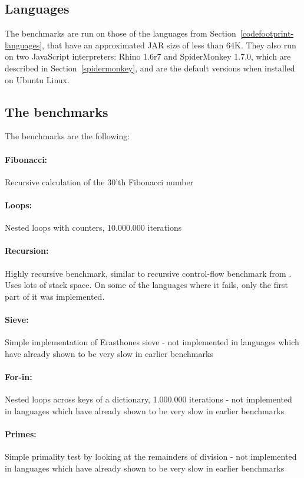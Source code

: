 \documentclass[11pt]{report}
\begin{document}
\subsection{Languages}
The benchmarks are run on those of the languages from Section~\ref{codefootprint-languages}, that have an approximated JAR size of less than 64K. They also run on two JavaScript interpreters: Rhino 1.6r7 and SpiderMonkey 1.7.0, which are described in Section~\ref{spidermonkey}, and are the default versions when installed on Ubuntu Linux.

\subsection{The benchmarks}
The benchmarks are the following:

\paragraph{Fibonacci:} Recursive calculation of the 30'th Fibonacci number
\paragraph{Loops:} Nested loops with counters, 10.000.000 iterations
\paragraph{Recursion:} Highly recursive benchmark, similar to recursive control-flow benchmark from \cite{sunspider, shootout}. Uses lots of stack space. On some of the languages where it fails, only the first part of it was implemented.
\paragraph{Sieve:} Simple implementation of Erasthones sieve - not implemented in languages which have already shown to be very slow in earlier benchmarks
\paragraph{For-in:} Nested loops across keys of a dictionary, 1.000.000 iterations - not implemented in languages which have already shown to be very slow in earlier benchmarks
\paragraph{Primes:} Simple primality test by looking at the remainders of division - not implemented in languages which have already shown to be very slow in earlier benchmarks
\end{document}
